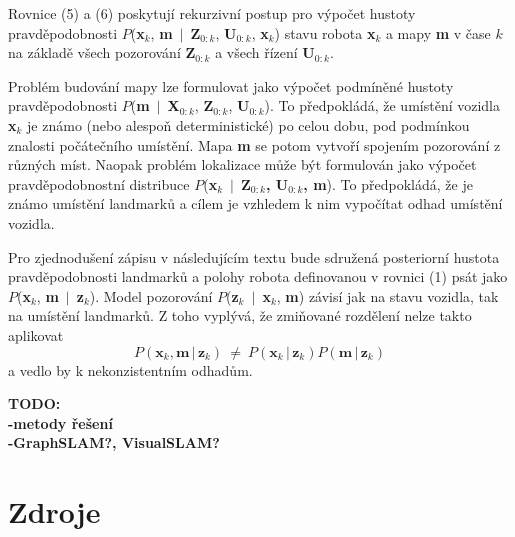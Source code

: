 \documentclass[12pt,a4paper]{article}
\begin{document}
Rovnice (5) a (6) poskytují rekurzivní postup pro výpočet hustoty pravděpodobnosti $P$(\textbf{x}$_k$, \textbf{m} $\,|\,$ \textbf{Z}$_{0:k}$, \textbf{U}$_{0:k}$, \textbf{x}$_k$) stavu robota \textbf{x}$_k$ a mapy \textbf{m} v čase $k$ na základě všech pozorování \textbf{Z}$_{0:k}$ a všech řízení \textbf{U}$_{0:k}$.

Problém budování mapy lze formulovat jako výpočet podmíněné hustoty pravděpodob\-nosti $P$(\textbf{m} $\,|\,$ \textbf{X}$_{0:k}$, \textbf{Z}$_{0:k}$, \textbf{U}$_{0:k}$). To předpokládá, že umístění vozidla \textbf{x}$_k$ je známo (nebo alespoň deterministické) po celou dobu, pod podmínkou znalosti počátečního umístění. Mapa \textbf{m} se potom vytvoří spojením pozorování z různých míst. Naopak problém lokalizace může být formulován jako výpočet pravděpodobnostní distribuce $P$(\textbf{x}$_k$ $\,|\,$ \textbf{Z$_{0:k}$, \textbf{U}$_{0:k}$, \textbf{m}}). To předpokládá, že je známo umístění landmarků a cílem je vzhledem k nim vypočítat odhad umístění vozidla.

Pro zjednodušení zápisu v následujícím textu bude sdružená posteriorní hustota pravděpodobnosti landmarků a polohy robota definovanou v rovnici (1) psát jako $P$(\textbf{x}$_k$, \textbf{m} $\,|\,$ \textbf{z}$_k$). Model pozorování $P$(\textbf{z}$_k$ $\,|\,$ \textbf{x}$_k$, \textbf{m}) závisí jak na stavu vozidla, tak na umístění landmarků. Z toho vyplývá, že zmiňované rozdělení nelze takto aplikovat
$$
P(\textbf{x}_k, \textbf{m} \,|\, \textbf{z}_k) \: \ne \: P(\textbf{x}_k \,|\, \textbf{z}_k)P(\textbf{m} \,|\, \textbf{z}_k)
$$
a vedlo by k nekonzistentním odhadům.


\textbf{TODO: \\
-metody řešení \\
-GraphSLAM?, VisualSLAM?} 

\section{Zdroje}
\end{document}
